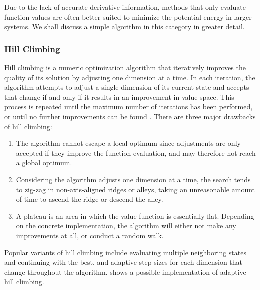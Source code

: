Due to the lack of accurate derivative information, methods that only evaluate function values are often better-suited to minimize the potential energy in larger systems. We shall discuss a simple algorithm in this category in greater detail.



\subsubsection*{Hill Climbing}

Hill climbing is a numeric optimization algorithm that iteratively improves the quality of its solution by adjusting one dimension at a time. In each iteration, the algorithm attempts to adjust a single dimension of its current state and accepts that change if and only if it results in an improvement in value space. This process is repeated until the maximum number of iterations has been performed, or until no further improvements can be found \cite{Russell}. There are three major drawbacks of hill climbing:
%
\begin{enumerate}
  \itemsep 0em
  \item {} The algorithm cannot escape a local optimum since adjustments are only accepted if they improve the function evaluation, and may therefore not reach a global optimum.
  \item {} Considering the algorithm adjusts one dimension at a time, the search tends to zig-zag in non-axis-aligned ridges or alleys, taking an unreasonable amount of time to ascend the ridge or descend the alley.
  \item {} A plateau is an area in which the value function is essentially flat. Depending on the concrete implementation, the algorithm will either not make any improvements at all, or conduct a random walk.
\end{enumerate}
%
Popular variants of hill climbing include evaluating multiple neighboring states and continuing with the best, and adaptive step sizes for each dimension that change throughout the algorithm.  shows a possible implementation of adaptive hill climbing.

\hfill

